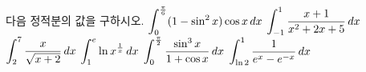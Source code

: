 다음 정적분의 값을 구하시오.
 $\displaystyle\int_{0}^{\frac{\pi}{6}}(1-\sin^2 x)\cos x\mkern3mu dx$
 $\displaystyle\int_{-1}^{1}\dfrac{x+1}{x^2+2x+5}\mkern3mu dx$
 $\displaystyle\int_{2}^{7}\dfrac{x}{\sqrt{x+2}}\mkern3mu dx$
 $\displaystyle\int_{1}^{e}\ln x^{\frac{1}{x}}\mkern3mu dx$
 $\displaystyle\int_{0}^{\frac{\pi}{2}}\dfrac{\sin^3 x}{1+\cos x}\mkern3mu dx$
 $\displaystyle\int_{\ln 2}^{1}\dfrac{1}{e^x-e^{-x}}\mkern3mu dx$
